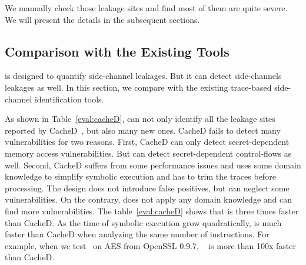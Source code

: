 We manually check those leakage sites and find most of them are quite severe.
We will present the details in the subsequent sections.

\subsection{Comparison with the Existing Tools}
\label{eval:scala}


\tool{} is designed to quantify side-channel leakages. But it can detect
side-channels leakages as well. In this section, we compare \tool{} with the
existing trace-based side-channel identification tools.

As shown in Table~\ref{eval:cacheD},
\tool{} can not only identify all the leakage sites reported by CacheD~\cite{203878}, but also
many new ones. CacheD fails to detect many vulnerabilities for two
reasons. First, CacheD can only detect secret-dependent memory access
vulnerabilities. But \tool{} can detect secret-dependent control-flows as well.
Second, CacheD suffers from some performance issues and uses some domain
knowledge to simplify symbolic execution and has to trim the traces before
processing. The design does not introduce false positives, but can neglect some
vulnerabilities. On the contrary, \tool{} does not apply any domain knowledge
and can find more vulnerabilities. The table~\ref{eval:cacheD} shows that
\tool{} is three times faster than CacheD. As the time of symbolic execution
grow quadratically, \tool{} is much faster than CacheD when analyzing the same
number of instructions. For example, when we test~\tool{} on AES from OpenSSL
0.9.7, ~\tool{} is more than 100x faster than CacheD.

